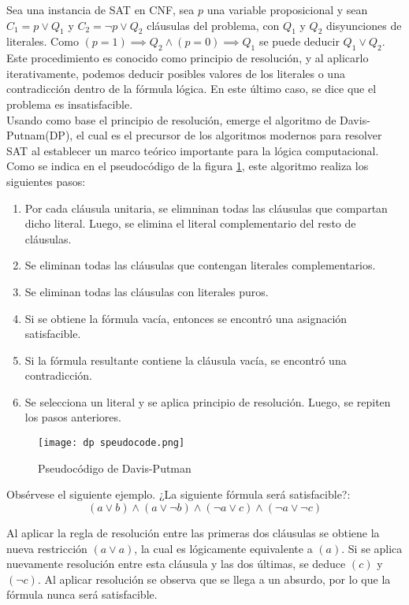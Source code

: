 \documentclass[12pt]{report}
\begin{document}
Sea una instancia de SAT en CNF, sea $p$ una variable proposicional y sean $C_1=p \lor  Q_1$  y  $C_2 = \neg p \lor  Q_2$ cláusulas del problema, con $Q_1$ y $Q_2$ disyunciones de literales. Como $(p=1)\implies  Q_2 \land (p=0)\implies  Q_1$ se puede deducir $Q_1\lor  Q_2$. Este procedimiento es conocido como principio de resolución, y al aplicarlo iterativamente, podemos deducir posibles valores de los literales o una contradicción dentro de la fórmula lógica. En este último caso, se dice que el problema es insatisfacible.\\ 

Usando como base el principio de resolución, emerge el algoritmo de Davis-Putnam(DP), el cual es el precursor de los algoritmos modernos para resolver SAT al establecer  un marco teórico importante para la lógica computacional. Como se indica en el pseudocódigo de la figura \ref{fig:dp}, este algoritmo realiza los siguientes pasos:
\begin{enumerate}
    \item Por cada cláusula  unitaria, se elimninan todas las cláusulas que compartan dicho literal. Luego, se elimina el literal complementario del resto de cláusulas.
    \item Se eliminan todas las cláusulas que contengan literales complementarios.
    \item Se eliminan todas las cláusulas con literales puros.
    \item Si se obtiene la fórmula vacía, entonces se encontró una asignación satisfacible. 
    \item Si la fórmula resultante contiene la cláusula vacía, se encontró una contradicción.
    \item Se selecciona un literal y se aplica principio de resolución. Luego, se repiten los pasos anteriores.
\end{enumerate}

\begin{figure}[ht]
    \centering
    \texttt{[image: dp speudocode.png]}
    \caption{Pseudocódigo de Davis-Putman}
    \label{fig:dp}
\end{figure}


Obsérvese el siguiente ejemplo. ¿La siguiente fórmula será satisfacible?:
$$(a\lor  b) \land(a\lor  \neg b) \land (\neg a\lor  c) \land(\neg a\lor  \neg c)$$

Al aplicar la regla de resolución entre las primeras dos cláusulas se obtiene la nueva restricción $(a \lor  a)$, la cual es lógicamente equivalente a $(a)$. Si se aplica nuevamente resolución entre esta cláusula y las dos últimas, se deduce $(c)$ y $(\neg c)$. Al aplicar resolución se observa que se llega a un absurdo, por lo que la fórmula nunca será satisfacible. \\
\end{document}
